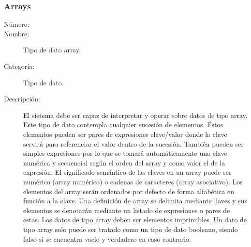 \subsubsection{Arrays}
\begin{framed}
	\begin{description}
		\item [Número:] \cn
		\item [Nombre:] Tipo de dato array.
		\item [Categoría:] Tipo de dato.
		\item [Descripción:] El sistema debe ser capaz de interpretar y operar sobre datos de tipo array. Este tipo
		de dato contempla cualquier sucesión de elementos. Estos elementos pueden ser pares de expresiones clave/valor donde la clave servirá
		para referenciar el valor dentro de la sucesión. También pueden ser simples expresiones por lo que se tomará automáticamente una clave
		numérica y secuencial según el orden del array y como valor el de la expresión. El significado semántico de las claves en un array puede
		ser numérico (array numérico) o cadenas de caracteres (array asociativo).  
		Los elementos del array serán ordenados por defecto de forma alfabética en función a la clave.
		Una definición de array se delimita mediante llaves y sus elementos se denotarán mediante un listado de expresiones o pares de estas.
		Los datos de tipo array deben ser elementos imprimibles. Un dato de tipo array solo puede ser tratado como un tipo de dato booleano,
		siendo falso si se encuentra vacío y verdadero en caso contrario.
	\end {description}
\end{framed}
